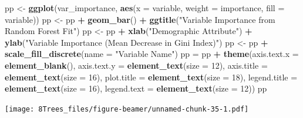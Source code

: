 \documentclass[10pt,ignorenonframetext,]{beamer}
\newenvironment{Shaded}{\begin{snugshade}}{\end{snugshade}}
\newcommand{\KeywordTok}[1]{\textcolor[rgb]{0.13,0.29,0.53}{\textbf{#1}}}
\newcommand{\DataTypeTok}[1]{\textcolor[rgb]{0.13,0.29,0.53}{#1}}
\newcommand{\DecValTok}[1]{\textcolor[rgb]{0.00,0.00,0.81}{#1}}
\newcommand{\StringTok}[1]{\textcolor[rgb]{0.31,0.60,0.02}{#1}}
\newcommand{\OperatorTok}[1]{\textcolor[rgb]{0.81,0.36,0.00}{\textbf{#1}}}
\newcommand{\NormalTok}[1]{#1}
\begin{document}
\begin{frame}[fragile]
\begin{Shaded}
\begin{Highlighting}[]
\NormalTok{pp <-}\StringTok{ }\KeywordTok{ggplot}\NormalTok{(var_importance, }\KeywordTok{aes}\NormalTok{(}\DataTypeTok{x =}\NormalTok{ variable, }\DataTypeTok{weight =}\NormalTok{ importance, }\DataTypeTok{fill =}\NormalTok{ variable))}
\NormalTok{pp <-}\StringTok{ }\NormalTok{pp }\OperatorTok{+}\StringTok{ }\KeywordTok{geom_bar}\NormalTok{() }\OperatorTok{+}\StringTok{ }\KeywordTok{ggtitle}\NormalTok{(}\StringTok{"Variable Importance from Random Forest Fit"}\NormalTok{)}
\NormalTok{pp <-}\StringTok{ }\NormalTok{pp }\OperatorTok{+}\StringTok{ }\KeywordTok{xlab}\NormalTok{(}\StringTok{"Demographic Attribute"}\NormalTok{) }\OperatorTok{+}\StringTok{ }\KeywordTok{ylab}\NormalTok{(}\StringTok{"Variable Importance (Mean Decrease in Gini Index)"}\NormalTok{)}
\NormalTok{pp <-}\StringTok{ }\NormalTok{pp }\OperatorTok{+}\StringTok{ }\KeywordTok{scale_fill_discrete}\NormalTok{(}\DataTypeTok{name =} \StringTok{"Variable Name"}\NormalTok{)}
\NormalTok{pp =}\StringTok{ }\NormalTok{pp }\OperatorTok{+}\StringTok{ }\KeywordTok{theme}\NormalTok{(}\DataTypeTok{axis.text.x =} \KeywordTok{element_blank}\NormalTok{(), }\DataTypeTok{axis.text.y =} \KeywordTok{element_text}\NormalTok{(}\DataTypeTok{size =} \DecValTok{12}\NormalTok{), }
    \DataTypeTok{axis.title =} \KeywordTok{element_text}\NormalTok{(}\DataTypeTok{size =} \DecValTok{16}\NormalTok{), }\DataTypeTok{plot.title =} \KeywordTok{element_text}\NormalTok{(}\DataTypeTok{size =} \DecValTok{18}\NormalTok{), }
    \DataTypeTok{legend.title =} \KeywordTok{element_text}\NormalTok{(}\DataTypeTok{size =} \DecValTok{16}\NormalTok{), }\DataTypeTok{legend.text =} \KeywordTok{element_text}\NormalTok{(}\DataTypeTok{size =} \DecValTok{12}\NormalTok{))}
\NormalTok{pp}
\end{Highlighting}
\end{Shaded}

\texttt{[image: 8Trees\_files/figure-beamer/unnamed-chunk-35-1.pdf]}

\end{frame}
\end{document}
